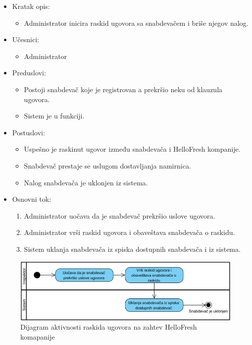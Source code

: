 \begin{itemize}
    \item Kratak opis:
        \begin{itemize}
            \item Administrator inicira raskid ugovora sa snabdevačem i briše njegov nalog.
        \end{itemize}
    \item Učesnici:
        \begin{itemize}
            \item Administrator
        \end{itemize}
    \item Preduslovi:
        \begin{itemize}
            \item Postoji snabdevač koje je registrovan a prekršio neku od klauzula ugovora.
            \item Sistem je u funkciji.
        \end{itemize}
    \item Postuslovi:
        \begin{itemize}
            \item Uspešno je raskinut ugovor između snabdevača i HelloFresh kompanije.
            \item Snabdevač prestaje se uslugom dostavljanja namirnica.
            \item Nalog snabdevača je uklonjen iz sistema.
        \end{itemize}
    \item Osnovni tok:
        \begin{enumerate}
            \item Administrator uočava da je snabdevač prekršio uslove ugovora.
            \item Administrator vrši raskid ugovora i obaveštava snabdevača o raskidu.
            \item Sistem uklanja snabdevača iz spiska dostupnih snabdevača i iz sistema.
        \end{enumerate}
\end{itemize}

\begin{figure}[H]
\begin{center}
\includegraphics[width=\textwidth]{Pictures/activity_supplier_contract_termination_2.png}
\end{center}
    \caption{Dijagram aktivnosti raskida ugovora na zahtev HelloFresh komapanije}
\label{fig:ActivitySupplierContractTermination2}
\end{figure}